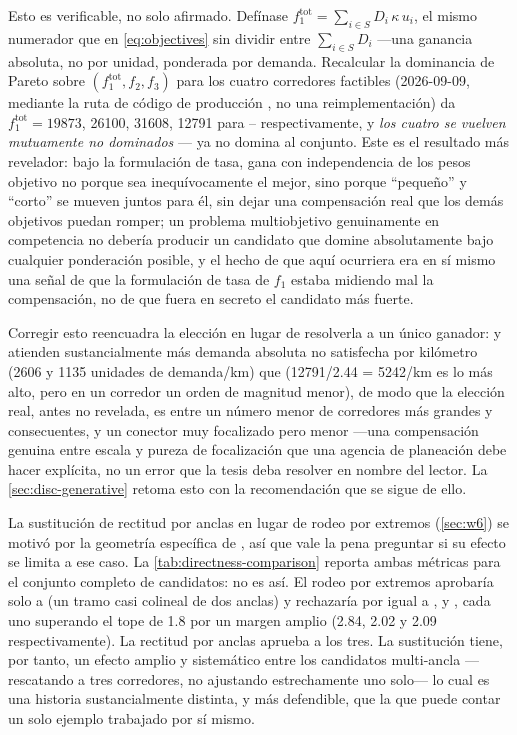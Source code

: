 Esto es verificable, no solo afirmado. Defínase $f_1^{\text{tot}} = \sum_{i\in S} D_i\,
\kappa\, u_i$, el mismo numerador que en \cref{eq:objectives} sin dividir entre
$\sum_{i\in S} D_i$ ---una ganancia absoluta, no por unidad, ponderada por demanda.
Recalcular la dominancia de Pareto sobre $(f_1^{\text{tot}}, f_2, f_3)$ para los cuatro
corredores factibles (2026-09-09, mediante la ruta de código de producción
, no una reimplementación) da $f_1^{\text{tot}} = \num{19873}$,
\num{26100}, \num{31608}, \num{12791} para --
respectivamente, y \emph{los cuatro se vuelven mutuamente no dominados} ---
ya no domina al conjunto. Este es el resultado más revelador: bajo la formulación de
tasa,  gana con independencia de los pesos objetivo no porque sea
inequívocamente el mejor, sino porque ``pequeño'' y ``corto'' se mueven juntos para él,
sin dejar una compensación real que los demás objetivos puedan romper; un problema
multiobjetivo genuinamente en competencia no debería producir un candidato que domine
absolutamente bajo cualquier ponderación posible, y el hecho de que aquí ocurriera era en
sí mismo una señal de que la formulación de tasa de $f_1$ estaba midiendo mal la
compensación, no de que  fuera en secreto el candidato más fuerte.

Corregir esto reencuadra la elección en lugar de resolverla a un único ganador:
 y  atienden sustancialmente más demanda absoluta no
satisfecha por kilómetro (\num{2606} y \num{1135} unidades de demanda/km) que
 (\num{12791}/2.44 = \num{5242}/km es lo más alto, pero en un corredor un
orden de magnitud menor), de modo que la elección real, antes no revelada, es entre un
número menor de corredores más grandes y consecuentes, y un conector muy focalizado pero
menor ---una compensación genuina entre escala y pureza de focalización que una agencia
de planeación debe hacer explícita, no un error que la tesis deba resolver en nombre del
lector. La \cref{sec:disc-generative} retoma esto con la recomendación que se sigue de
ello.

La sustitución de rectitud por anclas en lugar de rodeo por extremos (\cref{sec:w6}) se
motivó por la geometría específica de , así que vale la pena preguntar si
su efecto se limita a ese caso. La \cref{tab:directness-comparison} reporta ambas
métricas para el conjunto completo de candidatos: no es así. El rodeo por extremos
aprobaría solo a  (un tramo casi colineal de dos anclas) y rechazaría por
igual a ,  y , cada uno superando el tope de
\num{1.8} por un margen amplio (\num{2.84}, \num{2.02} y \num{2.09} respectivamente). La
rectitud por anclas aprueba a los tres. La sustitución tiene, por tanto, un efecto amplio
y sistemático entre los candidatos multi-ancla ---rescatando a tres corredores, no
ajustando estrechamente uno solo--- lo cual es una historia sustancialmente distinta, y
más defendible, que la que puede contar un solo ejemplo trabajado por sí mismo.

